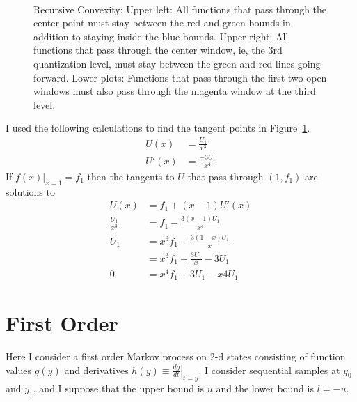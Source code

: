 \documentclass[]{article}
\begin{document}
\begin{figure}
  \centering
    \\
  
    \caption{Recursive Convexity: Upper left: All functions that pass
      through the center point must stay between the red and green
      bounds in addition to staying inside the blue bounds.  Upper
      right: All functions that pass through the center window, ie,
      the 3rd quantization level, must stay between the green and red
      lines going forward.  Lower plots: Functions that pass through
      the first two open windows must also pass through the magenta
      window at the third level.}
  \label{fig:recursive}
\end{figure}

I used the following calculations to find the tangent points in
Figure~\ref{fig:recursive}.
\begin{align*}
  U(x) &= \frac{U_1}{x^3} \\
  U'(x) &= \frac{-3U_1}{x^4}
\end{align*}
If $\left. f(x)\right|_{x=1} = f_1$ then the tangents to $U$ that pass
through $(1, f_1)$ are solutions to
\begin{align*}
  U(x) &= f_1 + (x-1)U'(x) \\
  \frac{U_1}{x^3} &=  f_1 - \frac{3(x-1)U_1}{x^4} \\
  U_1 &= x^3 f_1 + \frac{3(1-x)U_1}{x} \\
  &=  x^3 f_1 + \frac{3U_1}{x} - 3U_1 \\
  0 &= x^4 f_1 + 3U_1 - x4U_1
\end{align*}

\afterpage{\clearpage} %

\newpage
\section{First Order}
\label{sec:first-order}

Here I consider a first order Markov process on 2-d states consisting
of function values $g(y)$ and derivatives $h(y) \equiv \left. \frac{d
    g }{d t} \right|_{t=y}$.  I consider sequential samples at $y_0$
and $y_1$, and I suppose that the upper bound is $u$ and the lower
bound is $l=-u$.
\end{document}
